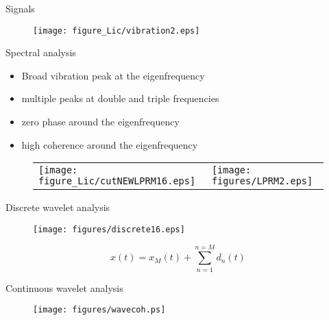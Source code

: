 \documentclass[clock,style=fyma,paper=screen,blackslide,trans=Wipe,mode=present]{powerdot}
\begin{document}
\begin{slide}{Signals}
\begin{figure}[H]
\centering
\texttt{[image: figure\_Lic/vibration2.eps]}
\end{figure}
\end{slide}

\begin{slide}{Spectral analysis}
\begin{itemize}
\item Broad vibration peak at the eigenfrequency

\item multiple peaks at double and triple frequencies

\item zero phase around the eigenfrequency

\item high coherence around the eigenfrequency
\end{itemize}
\begin{figure}[H]
\begin{tabular}{l l}
\hspace{-5mm}
\texttt{[image: figure\_Lic/cutNEWLPRM16.eps]} &
\texttt{[image: figures/LPRM2.eps]} \\
\end{tabular}
\end{figure}
\end{slide}

\begin{slide}{Discrete wavelet analysis}
\begin{figure}[H]
\centering
\texttt{[image: figures/discrete16.eps]}
\end{figure}
\begin{equation}
x(t)=x_{M}(t)+ \sum_{n=1}^{n=M} d_n(t)
\end{equation}
\end{slide}

\begin{slide}{Continuous wavelet analysis}
\begin{figure}[H]
\centering
\texttt{[image: figures/wavecoh.ps]}
\end{figure}
\end{slide}
\end{document}

